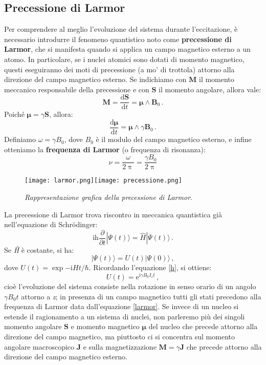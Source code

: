 \documentclass{report}
\renewcommand{\eqref}[1]{equazione \ref{#1}}
\numberwithin{equation}{section}
\numberwithin{figure}{section}
\renewcommand{\Vec}{\bm}
\begin{document}
\subsection{Precessione di Larmor}
Per comprendere al meglio l'evoluzione del sistema durante l'eccitazione, è necessario introdurre il fenomeno quantistico noto come \textbf{precessione di Larmor}, che si manifesta quando si applica un campo magnetico esterno a un atomo. In particolare, se i nuclei atomici sono dotati di momento magnetico, questi eseguiranno dei moti di precessione (a mo' di trottola) attorno alla direzione del campo magnetico esterno. Se indichiamo con $\Vec{M}$ il momento meccanico responsabile della precessione e con $\Vec{S}$ il momento angolare, allora vale:
\begin{equation}
    \Vec{M}=\frac{\mathrm{d}\Vec{S}}{\mathrm{d}t}=\Vec{\mu}\wedge\Vec{B}_0\,.
\end{equation}
Poiché $\Vec{\mu}=\gamma \Vec{S}$, allora:
\begin{equation}
    \frac{\mathrm{d}\Vec{\mu}}{\mathrm{d}t}=\Vec{\mu}\wedge\gamma\Vec{B}_0\,.
\end{equation}
Definiamo $\omega=\gamma B_0$, dove $B_0$ è il modulo del campo magnetico esterno, e infine otteniamo la \textbf{frequenza di Larmor} (o frequenza di risonanza):
\begin{equation}
    \boxed{\nu=\frac{\omega}{2\uppi}=\frac{\gamma B_0}{2\uppi}}
    \label{larmor}
\end{equation}

\begin{figure}[htp]
\centering
\texttt{[image: larmor.png]}\quad\texttt{[image: precessione.png]}
\caption{\label{fig:larmor} \textit{Rappresentazione grafica della precessione di Larmor}.}
\end{figure}

La precessione di Larmor trova riscontro in meccanica quantistica già nell'equazione di Schrödinger:
\begin{equation}
    \mathrm{ih}\frac{\partial}{\partial t}|\Psi(t)\rangle=\hat{H}|\Psi(t)\rangle\,.
\end{equation}
Se \textit{\^H} è costante, si ha:
\begin{equation}
    |\Psi(t)\rangle=U(t)|\Psi(0)\rangle\,,
\end{equation}
dove $U(t)=\exp{-\mathrm{i}Ht/\hbar}$. Ricordando l'\eqref{h}, si ottiene:
\begin{equation}
    U(t)=\mathrm{e}^{\mathrm{i}\gamma B_0 I_z t}\,,
\end{equation}
cioè l'evoluzione del sistema consiste nella rotazione in senso orario di un angolo $\gamma B_0 t$ attorno a \textit{z}; in presenza di un campo magnetico tutti gli stati precedono alla frequenza di Larmor data dall'\eqref{larmor}. Se invece di un nucleo si estende il ragionamento a un sistema di nuclei, non parleremo più dei singoli momento angolare $\Vec{S}$ e momento magnetico $\Vec{\mu}$ del nucleo che precede attorno alla direzione del campo magnetico, ma piuttosto ci si concentra sul momento angolare macroscopico $\Vec{J}$ e sulla magnetizzazione $\Vec{M}=\gamma \Vec{J}$ che precede attorno alla direzione del campo magnetico esterno.
\end{document}
